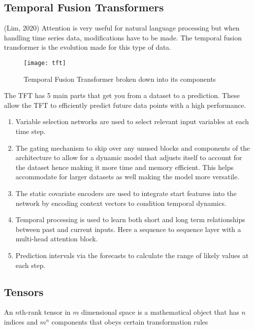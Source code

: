 \documentclass{article}
\begin{document}
\subsection{Temporal Fusion Transformers}
(Lim, 2020)
Attention is very useful for natural language processing but when handling time series data,
modifications have to be made. The temporal fusion transformer is the evolution made for this
type of data.
\begin{figure}[h!]
    \centering
    \texttt{[image: tft]}
    \caption{Temporal Fusion Transformer broken down into its components}
\end{figure}
The TFT has 5 main parts that get you from a dataset to a prediction. These allow the TFT to
efficiently predict future data points with a high performance.
\begin{enumerate}
\item Variable selection networks are used to select relevant input variables at each time step.
\item The gating mechanism to skip over any unused blocks and components of the architecture to allow for a dynamic model that adjusts itself to account for the dataset hence making it more time and memory efficient. This helps accommodate for larger datasets as well making the model more versatile.
\item The static covariate encoders are used to integrate start features into the network by encoding context vectors to condition temporal dynamics.
\item Temporal processing is used to learn both short and long term relationships between past and current inputs. Here a sequence to sequence layer with a multi-head attention block.
\item Prediction intervals via the forecasts to calculate the range of likely values at each step.
\end{enumerate}

\subsection{Tensors}
An $n$th-rank tensor in $m$ dimensional space is a mathematical object that has $n$ indices and $m^n$ components that obeys certain transformation rules
\end{document}
